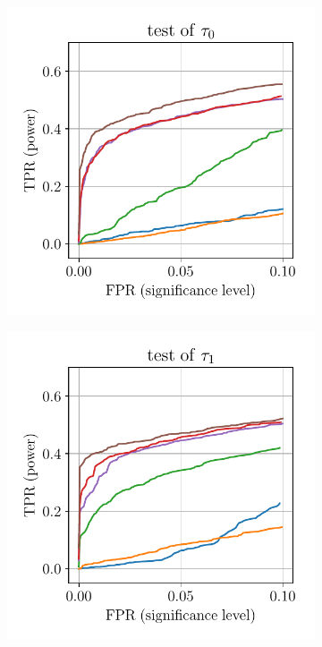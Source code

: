 \begin{figure}[h!]
\captionsetup{singlelinecheck = false, format= hang,justification=raggedright}
	\begin{subfigure}{0.286\textwidth}
		\centering
		\includegraphics[width=1\linewidth]{plots/empirical/flu/nonadaptive/N_50_T_7_lag_2_-0.1_tau0_roc_equal_tau-line-plot.pdf}
	\end{subfigure}%
	\begin{subfigure}{0.286\textwidth}
		\centering
		\includegraphics[width=1\linewidth]{plots/empirical/flu/nonadaptive/N_50_T_7_lag_2_-0.1_tau1_roc_equal_tau-line-plot.pdf}

\end{subfigure}
\end{figure}
